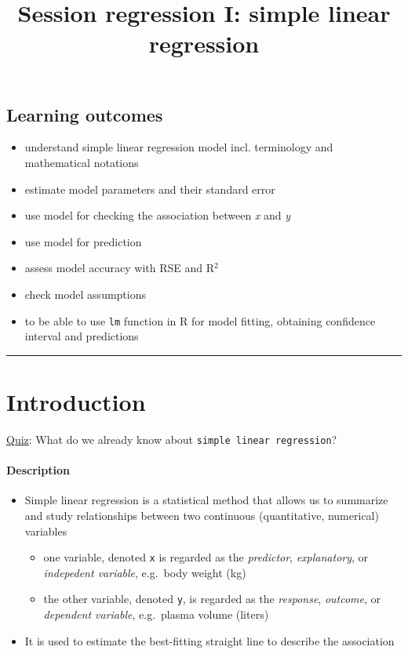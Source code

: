 \documentclass[]{article}
\title{Session regression I: simple linear regression}
\author{}
\date{}
\providecommand{\tightlist}{%
  \setlength{\itemsep}{0pt}\setlength{\parskip}{0pt}}
\let\oldparagraph\paragraph
\renewcommand{\paragraph}[1]{\oldparagraph{#1}\mbox{}}
\begin{document}
\maketitle

\hypertarget{learning-outcomes}{%
\subsection{Learning outcomes}\label{learning-outcomes}}

\begin{itemize}
\tightlist
\item
  understand simple linear regression model incl. terminology and
  mathematical notations
\item
  estimate model parameters and their standard error
\item
  use model for checking the association between \emph{x} and \emph{y}
\item
  use model for prediction
\item
  assess model accuracy with RSE and R\(^2\)
\item
  check model assumptions
\item
  to be able to use \texttt{lm} function in R for model fitting,
  obtaining confidence interval and predictions
\end{itemize}

\begin{center}\rule{0.5\linewidth}{\linethickness}\end{center}

\hypertarget{introduction}{%
\section{Introduction}\label{introduction}}

\href{https://forms.gle/bHZr1MP454npysAFA}{Quiz}: What do we already
know about \texttt{simple\ linear\ regression}?

\hypertarget{description}{%
\paragraph{Description}\label{description}}

\begin{itemize}
\tightlist
\item
  Simple linear regression is a statistical method that allows us to
  summarize and study relationships between two continuous
  (quantitative, numerical) variables

  \begin{itemize}
  \tightlist
  \item
    one variable, denoted \texttt{x} is regarded as the
    \emph{predictor}, \emph{explanatory}, or \emph{indepedent variable},
    e.g.~body weight (kg)
  \item
    the other variable, denoted \texttt{y}, is regarded as the
    \emph{response}, \emph{outcome}, or \emph{dependent variable},
    e.g.~plasma volume (liters)
  \end{itemize}
\item
  It is used to estimate the best-fitting straight line to describe the
  association
\end{itemize}
\end{document}
